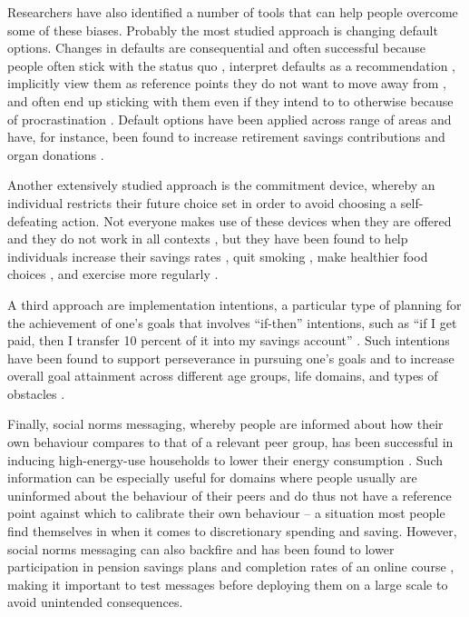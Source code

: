 Researchers have also identified a number of tools that can help people
overcome some of these biases. Probably the most studied approach is changing
default options. Changes in defaults are consequential and often successful
because people often stick with the status quo \citep{samuelson1988status},
interpret defaults as a recommendation \citep{mckenzie2006recommendations},
implicitly view them as reference points they do not want to move away from
\citep{johnson2003defaults, kahneman1979prospect}, and often end up sticking
with them even if they intend to to otherwise because of procrastination
\citep{carroll2009optimal, ericson2017interaction}. Default options have been
applied across range of areas and have, for instance, been found to increase
retirement savings contributions \citep{thaler2004save, madrian2001power,
beshears2009importance} and organ donations \citep{johnson2003defaults,
gimbel2003presumed, abadie2006impact}.

Another extensively studied approach is the commitment device, whereby an
individual restricts their future choice set in order to avoid choosing a
self-defeating action. Not everyone makes use of these devices when they are
offered \citep{bryan2010commitment} and they do not work in all contexts
\citep{laibson2015don,robinson2018some}, but they have been found to help
individuals increase their savings rates \citep{ashraf2006tying}, quit smoking
\citep{gine2010put}, make healthier food choices \citep{schwartz2014healthier},
and exercise more regularly \citep{royer2015incentives}.

A third approach are implementation intentions, a particular type of planning
for the achievement of one's goals that involves ``if-then'' intentions, such
as ``if I get paid, then I transfer 10 percent of it into my savings account''
\citep{gollwitzer2006implementation, rogers2015beyond}. Such intentions have
been found to support perseverance in pursuing one's goals
\citep{oettingen2010strategies} and to increase overall goal attainment across
different age groups, life domains, and types of obstacles
\citep{gollwitzer2006implementation}.

Finally, social norms messaging, whereby people are informed about how their
own behaviour compares to that of a relevant peer group, has been successful in
inducing high-energy-use households to lower their energy consumption
\citep{schultz2007constructive, allcott2011social, allcott2014short,
brandon2017effects}. Such information can be especially useful for domains
where people usually are uninformed about the behaviour of their peers and do
thus not have a reference point against which to calibrate their own behaviour
-- a situation most people find themselves in when it comes to discretionary
spending and saving. However, social norms messaging can also backfire and has
been found to lower participation in pension savings plans
\citep{beshears2015effect} and completion rates of an online course
\citep{rogers2016discouraged}, making it important to test messages before
deploying them on a large scale to avoid unintended consequences.

